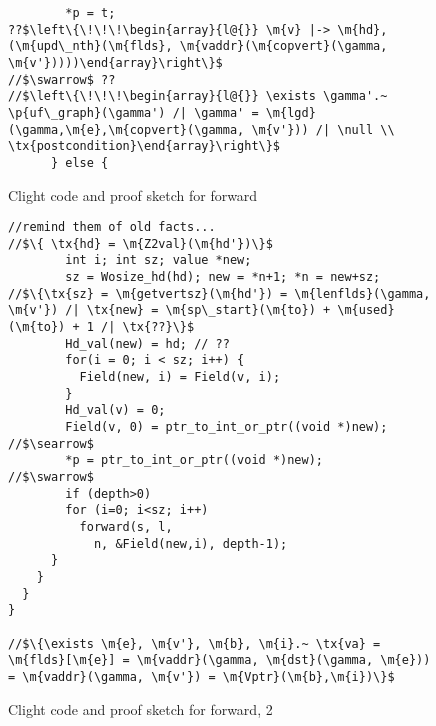 \begin{figure*}[h!]
\begin{lstlisting}
        *p = t;
??$\left\{\!\!\!\begin{array}{l@{}} \m{v} |-> \m{hd},(\m{upd\_nth}(\m{flds}, \m{vaddr}(\m{copvert}(\gamma, \m{v'}))))\end{array}\right\}$
//$\swarrow$ ??
//$\left\{\!\!\!\begin{array}{l@{}} \exists \gamma'.~ \p{uf\_graph}(\gamma') /| \gamma' = \m{lgd}(\gamma,\m{e},\m{copvert}(\gamma, \m{v'})) /| \null \\ \tx{postcondition}\end{array}\right\}$
      } else {
\end{lstlisting}
\vspace{-0.4em}
\caption{Clight code and proof sketch for forward}
\label{fig:forward}
\vspace{-1em}
\end{figure*}

\begin{figure*}[h!]
\vspace{-1ex}
  \begin{lstlisting}
//remind them of old facts...
//$\{ \tx{hd} = \m{Z2val}(\m{hd'})\}$
        int i; int sz; value *new;
        sz = Wosize_hd(hd); new = *n+1; *n = new+sz;
//$\{\tx{sz} = \m{getvertsz}(\m{hd'}) = \m{lenflds}(\gamma, \m{v'}) /| \tx{new} = \m{sp\_start}(\m{to}) + \m{used}(\m{to}) + 1 /| \tx{??}\}$        
        Hd_val(new) = hd; // ??
        for(i = 0; i < sz; i++) {
          Field(new, i) = Field(v, i);
        }
        Hd_val(v) = 0;
        Field(v, 0) = ptr_to_int_or_ptr((void *)new);
//$\searrow$
        *p = ptr_to_int_or_ptr((void *)new);
//$\swarrow$
        if (depth>0)
        for (i=0; i<sz; i++)
          forward(s, l, 
            n, &Field(new,i), depth-1);
      }
    }
  }
}

//$\{\exists \m{e}, \m{v'}, \m{b}, \m{i}.~ \tx{va} = \m{flds}[\m{e}] = \m{vaddr}(\gamma, \m{dst}(\gamma, \m{e})) = \m{vaddr}(\gamma, \m{v'}) = \m{Vptr}(\m{b},\m{i})\}$

\end{lstlisting}
\vspace{-0.4em}
\caption{Clight code and proof sketch for forward, 2}
\label{fig:forward}
\vspace{-1em}
\end{figure*}

